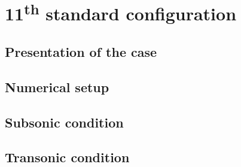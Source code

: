 \chapter{11\textsuperscript{th} standard configuration}
\label{cha:stcf11}

\chabstract{}

\minitoc
\newpage

\section{Presentation of the case}
\label{sec:stcf11_presentation}


\section{Numerical setup}
\label{sec:stcf11_numerical}


\section{Subsonic condition}
\label{sec:stcf11_subsonic}


\section{Transonic condition}
\label{sec:stcf11_transonic}


\chconclu{}

